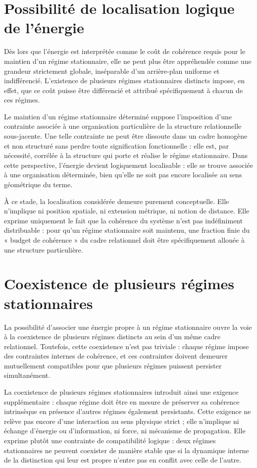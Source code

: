 \documentclass[11pt,a4paper]{article}
\begin{document}
\section{Possibilité de localisation logique de l’énergie}

Dès lors que l’énergie est interprétée comme le coût de cohérence requis pour le maintien d’un régime stationnaire, elle ne peut plus être appréhendée comme une grandeur strictement globale, inséparable d’un arrière-plan uniforme et indifférencié. L’existence de plusieurs régimes stationnaires distincts impose, en effet, que ce coût puisse être différencié et attribué spécifiquement à chacun de ces régimes.

Le maintien d’un régime stationnaire déterminé suppose l’imposition d’une contrainte associée à une organisation particulière de la structure relationnelle sous-jacente. Une telle contrainte ne peut être dissoute dans un cadre homogène et non structuré sans perdre toute signification fonctionnelle : elle est, par nécessité, corrélée à la structure qui porte et réalise le régime stationnaire. Dans cette perspective, l’énergie devient logiquement localisable : elle se trouve associée à une organisation déterminée, bien qu’elle ne soit pas encore localisée au sens géométrique du terme.

À ce stade, la localisation considérée demeure purement conceptuelle. Elle n’implique ni position spatiale, ni extension métrique, ni notion de distance. Elle exprime uniquement le fait que la cohérence du système n’est pas indéfiniment distribuable : pour qu’un régime stationnaire soit maintenu, une fraction finie du « budget de cohérence » du cadre relationnel doit être spécifiquement allouée à une structure particulière.

\section{Coexistence de plusieurs régimes stationnaires}

La possibilité d’associer une énergie propre à un régime stationnaire ouvre la voie à la coexistence de plusieurs régimes distincts au sein d’un même cadre relationnel. Toutefois, cette coexistence n’est pas triviale : chaque régime impose des contraintes internes de cohérence, et ces contraintes doivent demeurer mutuellement compatibles pour que plusieurs régimes puissent persister simultanément.

La coexistence de plusieurs régimes stationnaires introduit ainsi une exigence supplémentaire : chaque régime doit être en mesure de préserver sa cohérence intrinsèque en présence d’autres régimes également persistants. Cette exigence ne relève pas encore d’une interaction au sens physique strict ; elle n’implique ni échange d’énergie ou d’information, ni force, ni mécanisme de propagation. Elle exprime plutôt une contrainte de compatibilité logique : deux régimes stationnaires ne peuvent coexister de manière stable que si la dynamique interne de la distinction qui leur est propre n’entre pas en conflit avec celle de l’autre.
\end{document}
